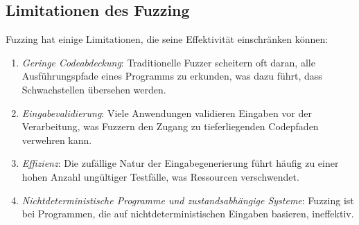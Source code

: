 \subsection{Limitationen des Fuzzing}\label{subsec:limitationen-des-fuzzign}
Fuzzing hat einige Limitationen, die seine Effektivität einschränken können:
\begin{enumerate}
    \item \textit{Geringe Codeabdeckung}: Traditionelle Fuzzer scheitern oft daran, alle Ausführungspfade eines Programms zu
    erkunden, was dazu führt, dass Schwachstellen übersehen werden.
    \item \textit{Eingabevalidierung}: Viele Anwendungen validieren Eingaben vor der Verarbeitung, was Fuzzern den Zugang zu
    tieferliegenden Codepfaden verwehren kann.
    \item \textit{Effizienz}: Die zufällige Natur der Eingabegenerierung führt häufig zu einer hohen Anzahl ungültiger Testfälle,
    was Ressourcen verschwendet.
    \item \textit{Nichtdeterministische Programme und zustandsabhängige Systeme}: Fuzzing ist bei Programmen, die auf
    nichtdeterministischen Eingaben basieren, ineffektiv.
\end{enumerate}
